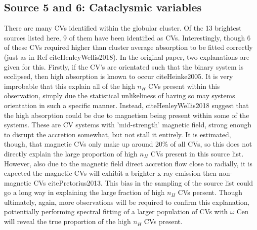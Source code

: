 \documentclass[aps,
                pra,  
                a4paper, 
                amsmath, 
                amssymb, 
                preprint,
                tightenlines,  
                amsfonts,
                nofootinbib,
                notitlepage
            ]{revtex4-2}
\begin{document}
\subsection{Source 5 and 6: Cataclysmic variables}
There are many CVs identified within the globular cluster. Of the 13 brightest sources listed here, 9 of them have been identified as CVs. Interestingly, though 6 of these CVs required higher than cluster average absorption to be fitted correctly (just as in Ref cite{HenleyWellis2018}). In the original paper, two explanations are given for this. Firstly, if the CV's are orientated such that the binary system is ecclipsed, then high absorption is known to occur cite{Heinke2005}. It is very improbable that this explain all of the high $n_H$ CVs present within this observation, simply due the statistical unlikeliness of having so may systems orientation in such a specific manner. Instead, cite{HenleyWellis2018} suggest that the high absorption could be due to magnetism being present within some of the systems. These are CV systems with 'mid-strength' magnetic field, strong enough to disrupt the accretion somewhat, but not stall it entirely. It is estimated, though, that magnetic CVs only make up around 20\% of all CVs, so this does not directly explain the large proportion of high $n_H$ CVs present in this source list. However, also due to the magnetic field direct accretion flow close to radially, it is expected the magnetic CVs will exhibit a brighter x-ray emission then non-magnetic CVs cite{Pretorius2013}. This bias in the sampling of the source list could go a long way in explaining the large fraction of high $n_H$ CVs persent. Though ultimately, again, more observations will be required to confirm this explanation, pottentially performing spectral fitting of a larger population of CVs with $\omega$ Cen will reveal the true proportion of the high $n_H$ CVs present.
\end{document}
